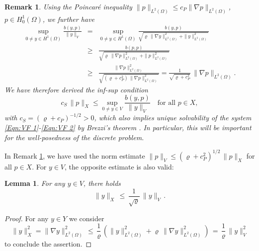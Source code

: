 \documentclass{article}
\newtheorem{lemma}{Lemma}
\newtheorem{remark}{Remark}
\numberwithin{equation}{section}
\begin{document}
\begin{remark}\label{Lemma:inf-sup}
  Using the Poincar\'{e} inequality
  $\| p \|_{L^2(\Omega)} \leq c_P \| \nabla p \|_{L^2(\Omega)}$,
  $p\in H^1_0(\Omega)$, we further have
  \begin{eqnarray*}
    \sup_{0\neq y\in H^1(\Omega)} \frac{b(y,p)}{\| y \|_V}
    & = & \sup_{0\neq y\in H^1(\Omega)}
          \frac{b(y,p)}{\sqrt{\varrho \, \| \nabla y \|_{L^2(\Omega)}^2 +
          \| y \|_{L^2(\Omega)}^2}} \\
    & \geq & \frac{b(p,p)}{\sqrt{\varrho \, \| \nabla p \|_{L^2(\Omega)}^2 +
             \| p \|_{L^2(\Omega)}^2}} \\
    & \geq & \frac{\| \nabla p \|_{L^2(\Omega)}^2}
             {\sqrt{(\varrho+c_P^2) \, \| \nabla p \|_{L^2(\Omega)}^2}}
             = \frac{1}{\sqrt{\varrho+c_P^2}} \, \| \nabla p \|_{L^2(\Omega)}.  
  \end{eqnarray*}
  We have therefore derived the inf-sup condition
  \begin{equation}\label{Eqn:inf-sup B}
    c_S \, \| p \|_X \leq \sup_{0\neq y\in V}
    \frac{b(y,p)}{\| y \|_V} 
    \quad \text{for all } p\in X,
  \end{equation}
  with $c_S = (\varrho+c_P)^{-1/2}>0$, which also implies unique solvability
  of the system \eqref{Eqn:VF 1}-\eqref{Eqn:VF 2} by Brezzi's theorem
  \cite{Brezzi1974RAIRO}. In particular, this will be important for the
  well-posedness of the discrete problem.  
\end{remark}

\noindent
In Remark \ref{Lemma:inf-sup}, we have used the norm
estimate $\| p \|_V \leq (\varrho+c_P^2)^{1/2} \, \| p \|_X$ for all
$p \in X$. For $y \in V$, the opposite estimate is also valid:

\begin{lemma}
  For any $y \in V$, there holds
  \begin{equation}\label{Eqn:Norm X Y}
    \| y \|_X \, \leq \, \frac{1}{\sqrt{\varrho}} \, \| y \|_V \, .
  \end{equation}
\end{lemma}

\begin{proof}
  For any $y \in Y$ we consider
  \[
    \| y \|_X^2 = \| \nabla y \|^2_{L^2(\Omega)} \, \leq \,
    \frac{1}{\varrho} \, \left( \| y \|_{L^2(\Omega)}^2 +
      \varrho \, \| \nabla y \|^2_{L^2(\Omega)} \right) \, = \,
    \frac{1}{\varrho} \, \| y \|_V^2 
  \]
  to conclude the assertion.
\end{proof}
\end{document}
